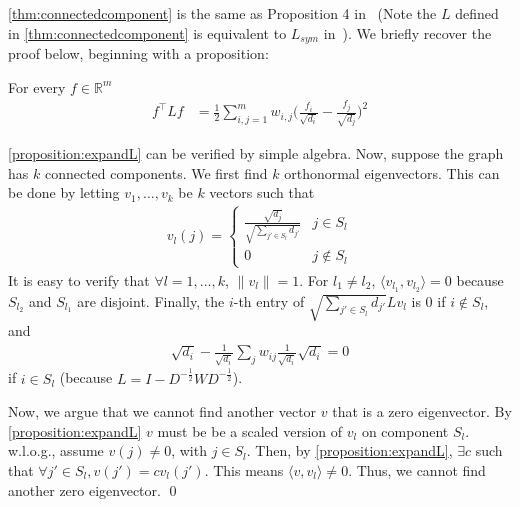 \cref{thm:connectedcomponent} is the same as Proposition 4 in~\cite{von2007tutorial} (Note the $L$ defined in \cref{thm:connectedcomponent} is equivalent to $L_{sym}$ in~\cite{von2007tutorial}).
We briefly recover the proof below, beginning with a proposition:
\begin{proposition}\cite{von2007tutorial}\label{proposition:expandL}
For every $f\in\mathbb{R}^m$ 
\begin{align}
    f^\top L f &= \frac{1}{2}\sum_{i,j=1}^m w_{i,j}\Big(\frac{f_i}{\sqrt{d_i}} - \frac{f_j}{\sqrt{d_j}}\Big)^2
\end{align}
\end{proposition}
\cref{proposition:expandL} can be verified by simple algebra. 
Now, suppose the graph has $k$ connected components.
We first find $k$ orthonormal eigenvectors.
This can be done by letting $v_1, \ldots, v_k$ be $k$ vectors such that 
\begin{align}
    v_l(j) = \begin{cases} \frac{\sqrt{d_j}}{\sqrt{\sum_{j'\in S_l} d_{j'}}} & j \in S_l \\ 0 & j \not\in S_l \end{cases}
\end{align}
It is easy to verify that $\forall l=1,\ldots,k$, $\|v_l\| = 1$.
For ${l_1}\neq {l_2}$, $\langle v_{l_1}, v_{l_2} \rangle=0$ because $S_{l_2}$ and $S_{l_1}$ are disjoint.
Finally, the $i$-th entry of $\sqrt{\sum_{j'\in S_l} d_{j'}} Lv_l$ is 0 if $i\not\in S_l$, and 
\begin{align}
    \sqrt{d_i} - \frac{1}{\sqrt{d_i}} \sum_{j}w_{ij} \frac{1}{\sqrt{d_i}}\sqrt{d_i} = 0
\end{align}
if $i\in S_l$ (because $L = I - D^{-\frac{1}{2}} W D^{-\frac{1}{2}}$).

Now, we argue that we cannot find another vector $v$ that is a zero eigenvector.
By \cref{proposition:expandL} $v$ must be be a scaled version of $v_l$ on component $S_l$.
w.l.o.g., assume $v(j)\neq 0$, with $j\in S_l$.
Then, by \cref{proposition:expandL}, $\exists c$ such that $\forall {j'}\in S_l, v(j') = c v_l(j')$.
This means $\langle v, v_l\rangle \neq 0$.
Thus, we cannot find another zero eigenvector. 
\qed


